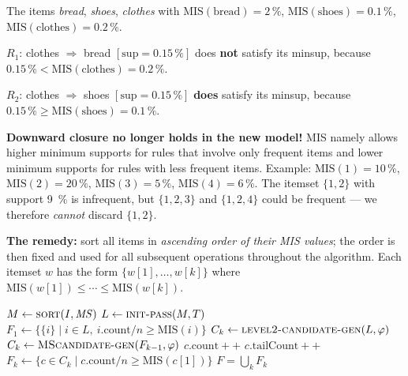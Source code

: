 \documentclass[11pt,a4paper]{article}
\theoremstyle{definition}
\begin{document}
\begin{defbox}
The items \emph{bread}, \emph{shoes}, \emph{clothes} with $\mathrm{MIS}(\text{bread})=2\,\%$,
$\mathrm{MIS}(\text{shoes})=0.1\,\%$, $\mathrm{MIS}(\text{clothes})=0.2\,\%$.

$R_1$: clothes $\Rightarrow$ bread $[\mathrm{sup}=0.15\,\%]$ does \textbf{not} satisfy its
minsup, because $0.15\,\%<\mathrm{MIS}(\text{clothes})=0.2\,\%$.

$R_2$: clothes $\Rightarrow$ shoes $[\mathrm{sup}=0.15\,\%]$ \textbf{does} satisfy its minsup,
because $0.15\,\%\ge\mathrm{MIS}(\text{shoes})=0.1\,\%$.
\end{defbox}

\textbf{Downward closure no longer holds in the new model!} MIS namely allows higher minimum
supports for rules that involve only frequent items and lower minimum supports for rules with
less frequent items. Example: $\mathrm{MIS}(1)=10\,\%$, $\mathrm{MIS}(2)=20\,\%$,
$\mathrm{MIS}(3)=5\,\%$, $\mathrm{MIS}(4)=6\,\%$. The itemset $\{1,2\}$ with support 9~\% is
infrequent, but $\{1,2,3\}$ and $\{1,2,4\}$ could be frequent --- we therefore \emph{cannot}
discard $\{1,2\}$.

\textbf{The remedy:} sort all items in \emph{ascending order of their MIS values}; the order is
then fixed and used for all subsequent operations throughout the algorithm. Each itemset $w$ has
the form $\{w[1],\dots,w[k]\}$ where $\mathrm{MIS}(w[1])\le\cdots\le\mathrm{MIS}(w[k])$.

\begin{defbox}
\begin{algorithmic}[1]
\State $M\gets \textsc{sort}(I,\mathit{MS})$ 
\State $L\gets \textsc{init-pass}(M,T)$ 
\State $F_1\gets \{\{i\}\mid i\in L,\ i.\mathrm{count}/n\ge \mathrm{MIS}(i)\}$
     \State $C_k\gets \textsc{level2-candidate-gen}(L,\varphi)$
  \Else
     \State $C_k\gets \textsc{MScandidate-gen}(F_{k-1},\varphi)$
  \EndIf
         \State $c.\mathrm{count}{+}{+}$ \EndIf
         \State $c.\mathrm{tailCount}{+}{+}$
            \EndIf
     \EndFor
  \EndFor
  \State $F_k\gets \{c\in C_k\mid c.\mathrm{count}/n\ge \mathrm{MIS}(c[1])\}$
\EndFor
\State \Return $F=\bigcup_k F_k$
\end{algorithmic}
\end{defbox}
\end{document}
